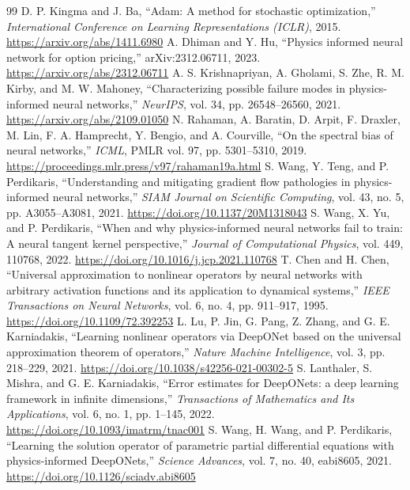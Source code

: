 \documentclass[11pt,a4paper]{article}
\begin{document}
\begin{thebibliography}{99}
 D. P. Kingma and J. Ba, ``Adam: A method for stochastic optimization,'' \emph{International Conference on Learning Representations (ICLR)}, 2015. \url{https://arxiv.org/abs/1411.6980}
 A. Dhiman and Y. Hu, ``Physics informed neural network for option pricing,'' arXiv:2312.06711, 2023. \url{https://arxiv.org/abs/2312.06711}
 A. S. Krishnapriyan, A. Gholami, S. Zhe, R. M. Kirby, and M. W. Mahoney, ``Characterizing possible failure modes in physics-informed neural networks,'' \emph{NeurIPS}, vol. 34, pp. 26548--26560, 2021. \url{https://arxiv.org/abs/2109.01050}
 N. Rahaman, A. Baratin, D. Arpit, F. Draxler, M. Lin, F. A. Hamprecht, Y. Bengio, and A. Courville, ``On the spectral bias of neural networks,'' \emph{ICML}, PMLR vol. 97, pp. 5301--5310, 2019. \url{https://proceedings.mlr.press/v97/rahaman19a.html}
 S. Wang, Y. Teng, and P. Perdikaris, ``Understanding and mitigating gradient flow pathologies in physics-informed neural networks,'' \emph{SIAM Journal on Scientific Computing}, vol. 43, no. 5, pp. A3055--A3081, 2021. \url{https://doi.org/10.1137/20M1318043}
 S. Wang, X. Yu, and P. Perdikaris, ``When and why physics-informed neural networks fail to train: A neural tangent kernel perspective,'' \emph{Journal of Computational Physics}, vol. 449, 110768, 2022. \url{https://doi.org/10.1016/j.jcp.2021.110768}
 T. Chen and H. Chen, ``Universal approximation to nonlinear operators by neural networks with arbitrary activation functions and its application to dynamical systems,'' \emph{IEEE Transactions on Neural Networks}, vol. 6, no. 4, pp. 911--917, 1995. \url{https://doi.org/10.1109/72.392253}
 L. Lu, P. Jin, G. Pang, Z. Zhang, and G. E. Karniadakis, ``Learning nonlinear operators via DeepONet based on the universal approximation theorem of operators,'' \emph{Nature Machine Intelligence}, vol. 3, pp. 218--229, 2021. \url{https://doi.org/10.1038/s42256-021-00302-5}
 S. Lanthaler, S. Mishra, and G. E. Karniadakis, ``Error estimates for DeepONets: a deep learning framework in infinite dimensions,'' \emph{Transactions of Mathematics and Its Applications}, vol. 6, no. 1, pp. 1--145, 2022. \url{https://doi.org/10.1093/imatrm/tnac001}
 S. Wang, H. Wang, and P. Perdikaris, ``Learning the solution operator of parametric partial differential equations with physics-informed DeepONets,'' \emph{Science Advances}, vol. 7, no. 40, eabi8605, 2021. \url{https://doi.org/10.1126/sciadv.abi8605}

\end{thebibliography}
\end{document}
